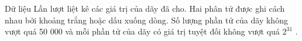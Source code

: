 Dữ liệu
Lần lượt liệt kê các giá trị của dãy đã cho. Hai phân tử được ghi cách nhau bởi khoảng trắng hoặc dấu xuống dòng. Số lượng phần tử của dãy không vượt quá 50 000 và mỗi phần tử của dãy có giá trị tuyệt đối không vượt quá $2^{31}$   .